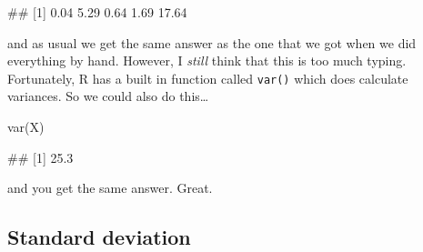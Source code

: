 \documentclass[
]{book}
\newenvironment{Shaded}{\begin{snugshade}}{\end{snugshade}}
\newcommand{\DecValTok}[1]{\textcolor[rgb]{0.00,0.00,0.81}{#1}}
\newcommand{\FunctionTok}[1]{\textcolor[rgb]{0.00,0.00,0.00}{#1}}
\newcommand{\NormalTok}[1]{#1}
\newcommand{\OtherTok}[1]{\textcolor[rgb]{0.56,0.35,0.01}{#1}}
\newcommand{\SpecialCharTok}[1]{\textcolor[rgb]{0.00,0.00,0.00}{#1}}
\begin{document}
\begin{Shaded}
\end{Shaded}

\begin{Shaded}
\begin{Highlighting}[]
\NormalTok{\#\# [1]  0.04  5.29  0.64  1.69 17.64}
\end{Highlighting}
\end{Shaded}

and as usual we get the same answer as the one that we got when we did everything by hand. However, I \emph{still} think that this is too much typing. Fortunately, R has a built in function called \texttt{var()} which does calculate variances. So we could also do this\ldots{}

\begin{Shaded}
\begin{Highlighting}[]
\FunctionTok{var}\NormalTok{(X)}
\end{Highlighting}
\end{Shaded}

\begin{Shaded}
\begin{Highlighting}[]
\NormalTok{\#\# [1] 25.3}
\end{Highlighting}
\end{Shaded}

and you get the same answer. Great.

\hypertarget{sd}{%
\subsection{Standard deviation}\label{sd}}
\end{document}
